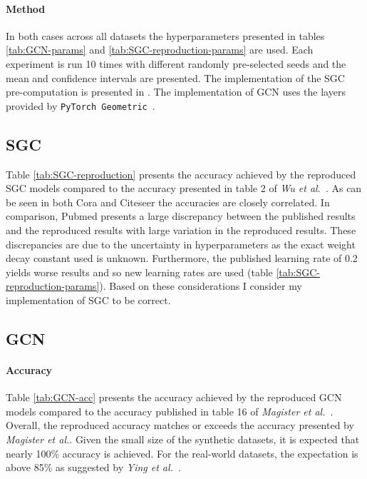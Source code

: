 \paragraph{Method}
In both cases across all datasets the hyperparameters presented in tables \ref{tab:GCN-params} and \ref{tab:SGC-reproduction-params} are used.
Each experiment is run 10 times with different randomly pre-selected seeds and the mean and confidence intervals are presented.
The implementation of the SGC pre-computation is presented in .
The implementation of GCN uses the layers provided by \texttt{PyTorch Geometric}~\cite{Fey/Lenssen/2019}.

\subsection{SGC}


Table \ref{tab:SGC-reproduction} presents the accuracy achieved by the reproduced SGC models compared to the accuracy presented in table 2 of \textit{Wu et al.}~\cite{wu2019simplifying}.
As can be seen in both Cora and Citeseer the accuracies are closely correlated.
In comparison, Pubmed presents a large discrepancy between the published results and the reproduced results with large variation in the reproduced results.
These discrepancies are due to the uncertainty in hyperparameters as the exact weight decay constant used is unknown.
Furthermore, the published learning rate of 0.2 yields worse results and so new learning rates are used (table \ref{tab:SGC-reproduction-params}).
Based on these considerations I consider my implementation of SGC to be correct.

\subsection{GCN}
\label{sec:GCN-reproduction}
\paragraph{Accuracy}

Table \ref{tab:GCN-acc} presents the accuracy achieved by the reproduced GCN models compared to the accuracy published in table 16 of \textit{Magister et al.}~\cite{magister2021gcexplainer}.
Overall, the reproduced accuracy matches or exceeds the accuracy presented by \textit{Magister et al.}.
Given the small size of the synthetic datasets, it is expected that nearly 100\% accuracy is achieved.
For the real-world datasets, the expectation is above 85\% as suggested by \textit{Ying et al.}~\cite{ying2019gnnexplainer}.

